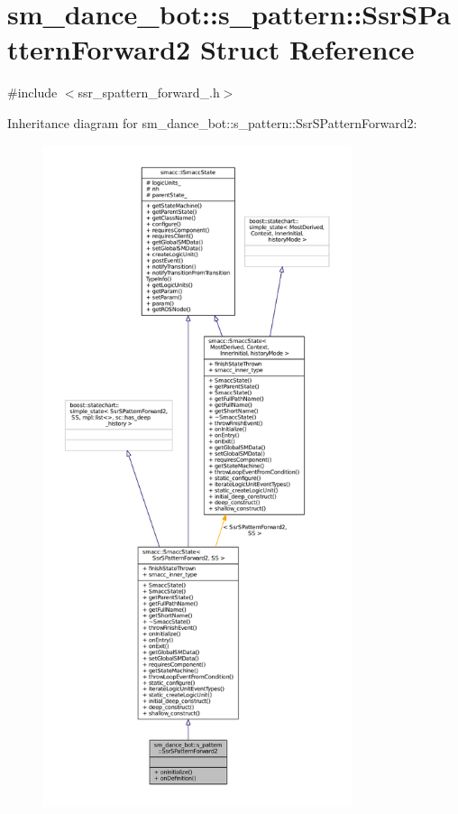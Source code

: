 \hypertarget{structsm__dance__bot_1_1s__pattern_1_1SsrSPatternForward2}{}\section{sm\+\_\+dance\+\_\+bot\+:\+:s\+\_\+pattern\+:\+:Ssr\+S\+Pattern\+Forward2 Struct Reference}
\label{structsm__dance__bot_1_1s__pattern_1_1SsrSPatternForward2}


{\ttfamily \#include $<$ssr\+\_\+spattern\+\_\+forward\+\_.\+h$>$}



Inheritance diagram for sm\+\_\+dance\+\_\+bot\+:\+:s\+\_\+pattern\+:\+:Ssr\+S\+Pattern\+Forward2\+:
\nopagebreak
\begin{figure}[H]
\begin{center}
\leavevmode
\includegraphics[height=550pt]{structsm__dance__bot_1_1s__pattern_1_1SsrSPatternForward2__inherit__graph}
\end{center}
\end{figure}


